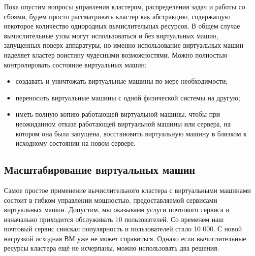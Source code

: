 \documentclass[14pt, a4paper]{article}
\begin{document}
Пока опустим вопросы управления кластером, распределения задач и работы со сбоями, будем
просто рассматривать кластер как абстракцию, содержащую некоторое количество однородных
вычислительных ресурсов. В общем случае вычислительные узлы могут использоваться и без
виртуальных машин, запущенных поверх аппаратуры, но именно использование виртуальных машин
наделяет кластер воистину чудесными возможностями. Можно полностью контролировать состояние
виртуальных машин:

\begin{itemize}
    \item создавать и уничтожать виртуальные машины по мере необходимости;
    \item переносить виртуальные машины с одной физической системы на другую;
    \item иметь полную копию работающей виртуальной машины, чтобы при неожиданном отказе
    работающей виртуальной машины или сервера, на котором она была запущена, восстановить
    виртуальную машину в близком к исходному состоянии на новом сервере.\\
\end{itemize}

\subsection*{Масштабирование виртуальных машин}

Самое простое применение вычислительного кластера с виртуальными машинами состоит в гибком
управлении мощностью, предоставляемой сервисами виртуальных машин. Допустим, мы оказываем
услуги почтового сервиса и изначально приходится обслуживать 10 пользователей. Со временем наш
почтовый сервис снискал популярность и пользователей стало 10 000. С новой нагрузкой исходная
ВМ уже не может справиться. Однако если вычислительные ресурсы кластера ещё не исчерпаны,
можно использовать два решения:
\end{document}
